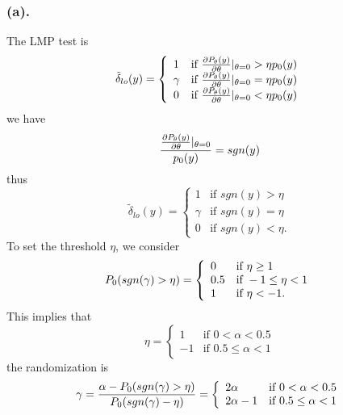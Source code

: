 \documentclass[a4paper,english,12pt]{article}
\begin{document}
\subsubsection*{(a).} The LMP test is
\begin{equation*}
\tilde{\delta}_{lo}(y) =
\left\{
	\begin{array}{ll}
		1  & \mbox{if } \frac{\partial \mathnormal{P}_{\theta}(y)}{\partial \theta} |_{\theta=0}>\eta \mathnormal{p}_0(y)\\
		\gamma & \mbox{if } \frac{\partial \mathnormal{P}_{\theta}(y)}{\partial \theta} |_{\theta=0}=\eta \mathnormal{p}_0(y)\\
		0 & \mbox{if } \frac{\partial \mathnormal{P}_{\theta}(y)}{\partial \theta} |_{\theta=0}<\eta \mathnormal{p}_0(y)\\
	\end{array}
\right.
\end{equation*}
we have
\begin{equation*}
\frac{\frac{\partial \mathnormal{P}_{\theta}(y)}{\partial \theta} |_{\theta=0}}{\mathnormal{p}_0(y)}= sgn(y)
\end{equation*}
thus
\begin{equation*}
\tilde{\delta}_{lo}(y) =
\left\{
	\begin{array}{ll}
		1  & \mbox{if } sgn(y)>\eta\\
		\gamma & \mbox{if } sgn(y)=\eta\\
		0 & \mbox{if } sgn(y)<\eta.
	\end{array}
\right.
\end{equation*}
To set the threshold $\eta$, we consider
\begin{equation*}
\mathnormal{P}_0(sgn(\gamma)>\eta) =
\left\{
	\begin{array}{ll}
		0  & \mbox{if } \eta \geq 1\\
		0.5 & \mbox{if } -1 \leq \eta < 1\\
		1 & \mbox{if } \eta <-1.
	\end{array}
\right.
\end{equation*}
This implies that
\begin{equation*}
\eta =
\left\{
	\begin{array}{ll}
		1  & \mbox{if } 0<\alpha<0.5\\
		-1 & \mbox{if } 0.5\leq \alpha < 1
	\end{array}
\right.
\end{equation*}
the randomization is 
\begin{equation*}
\gamma = \frac{\alpha - \mathnormal{P}_0(sgn(\gamma)>\eta)}{\mathnormal{P}_0(sgn(\gamma)-\eta)}=
\left\{
	\begin{array}{ll}
		2\alpha  & \mbox{if } 0<\alpha<0.5\\
		2\alpha -1 & \mbox{if } 0.5\leq \alpha < 1
	\end{array}
\right.
\end{equation*}
\end{document}
